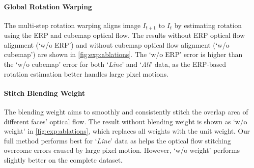 \paragraph{Global Rotation Warping}
The multi-step rotation warping aligns image $I_{t+1}$ to $I_t$ by estimating rotation using the ERP and cubemap optical flow.
The results without ERP optical flow alignment (`w/o ERP') and without cubemap optical flow alignment (`w/o cubemap') are shown in \cref{fig:exp:ablations}.
The `w/o ERP' error is higher than the `w/o cubemap' error for both `\emph{Line}' and `\emph{All}' data,
as the ERP-based rotation estimation better handles large pixel motions.


\paragraph{Stitch Blending Weight}
The blending weight aims to smoothly and consistently stitch the overlap area of different faces' optical flow.
The result without blending weight is shown as `w/o weight' in \cref{fig:exp:ablations}, which replaces all weights with the unit weight.
Our full method performs best for `\emph{Line}' data as helps the optical flow stitching overcome errors caused by large pixel motion.
However, `w/o weight' performs slightly better on the complete dataset.


